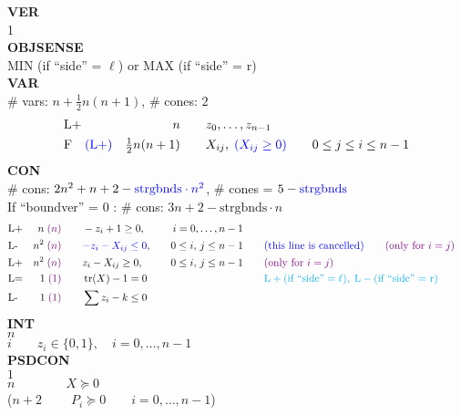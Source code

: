 \documentclass[11pt,a4paper]{article}
\DeclareMathOperator{\tr}{tr}
\theoremstyle{definition}
\begin{document}
{\footnotesize
\noindent
\textbf{VER} \\
1 \\
\textbf{OBJSENSE} \\
MIN (if ``side'' = $\ell$) \; or \; MAX (if ``side'' = r) \\
\textbf{VAR} \\
\# vars:  $n+\tfrac{1}{2}n(n+1)$, \qquad \# cones: $2$ \\
\[
  \begin{aligned}
    &\text{L+} &n \qquad & z_0,\dots,z_{n-1} \\
    &\text{F}\quad{\color{blue} (\text{L}+)}  &\tfrac{1}{2}n(n+1) \qquad & X_{ij},\;
    {\color{blue} (X_{ij} \geq 0)} \qquad 0 \leq j \leq i \leq n-1
  \end{aligned}
\]
\textbf{CON} \\
\# cons: $2n^2+n+2 - {\color{blue}\text{strgbnds}\cdot n^2}$, \qquad
\# cones = $5 - {\color{blue} \text{strgbnds}}$\\
{\color{violet} If ``boundver'' = 0 : \# cons: $3n+2 - \text{strgbnds}\cdot n$} \\
\[
  \begin{aligned}
    &\text{L+} &n\; {\color{violet}(n)} \qquad & -z_i + 1 \geq 0, \quad & i = 0,\dots,n-1 \\
    &\text{L-} &n^2\; {\color{violet}(n)} \qquad & {\color{blue}-z_i - X_{ij} \leq 0},\quad & 0
    \leq i,\, j \leq n-1 &\qquad {\color{blue} \text{(this line is
        cancelled)}} \qquad {\color{violet} (\text{only for } i = j)}\\
    &\text{L+} &n^2\; {\color{violet}(n)} \qquad & z_i - X_{ij} \geq 0,\quad & 0
    \leq i, \, j \leq n-1 &\qquad {\color{violet} (\text{only for } i = j)}\\
    &\text{L=}  &1\; {\color{violet}(1)} \qquad & \tr(X) - 1 = 0 \quad & \qquad & \qquad
    {\color{cyan} \text{L}+ (\text{if ``side''} = \ell),\; \text{L}-
      (\text{if ``side'' = r})} \\
    &\text{L-}  &1\; {\color{violet}(1)} \qquad & \sum z_i - k \leq 0
  \end{aligned}
\]
\textbf{INT} \\
$n$ \\
$i \qquad z_i \in \{0,1\}, \quad i = 0,\dots,n-1$ \\
\textbf{PSDCON} \\
$1$  \\
$n \qquad \qquad X \succeq 0$ \\
{\color{red}($n+2 \qquad \; P_i \succeq 0 \qquad i = 0,\dots,n-1$)} \\
}
\end{document}
